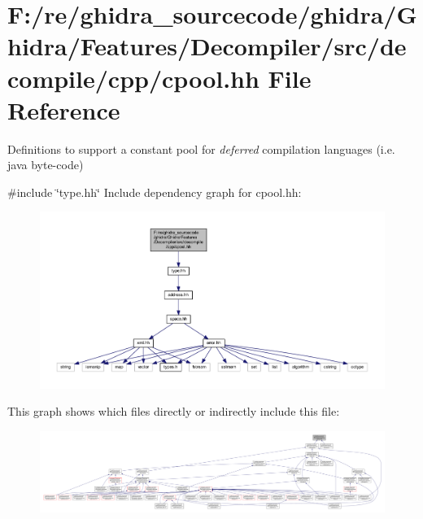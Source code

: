 \hypertarget{cpool_8hh}{}\section{F\+:/re/ghidra\+\_\+sourcecode/ghidra/\+Ghidra/\+Features/\+Decompiler/src/decompile/cpp/cpool.hh File Reference}
\label{cpool_8hh}


Definitions to support a constant pool for {\itshape deferred} compilation languages (i.\+e. java byte-\/code)  


{\ttfamily \#include \char`\"{}type.\+hh\char`\"{}}\newline
Include dependency graph for cpool.\+hh\+:
\nopagebreak
\begin{figure}[H]
\begin{center}
\leavevmode
\includegraphics[width=350pt]{cpool_8hh__incl}
\end{center}
\end{figure}
This graph shows which files directly or indirectly include this file\+:
\nopagebreak
\begin{figure}[H]
\begin{center}
\leavevmode
\includegraphics[width=350pt]{cpool_8hh__dep__incl}
\end{center}
\end{figure}
